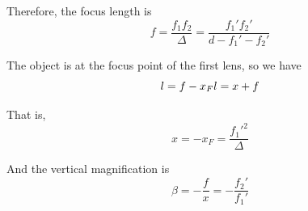 \documentclass{article}
\begin{document}
Therefore, the focus length is
\begin{equation}
    f = \frac{f_1f_2}{\Delta} = \frac{f_1'f_2'}{d-f_1'-f_2'}
\end{equation}

The object is at the focus point of the first lens, so we have
\begin{equation}
    l = f-x_F\\
    l = x+f
\end{equation}

That is,
\begin{equation}
    x = -x_F = \frac{f_1'^2}{\Delta}
\end{equation}

And the vertical magnification is
\begin{equation}
    \beta = -\frac{f}{x} = -\frac{f_2'}{f_1'}
\end{equation}
\end{document}
